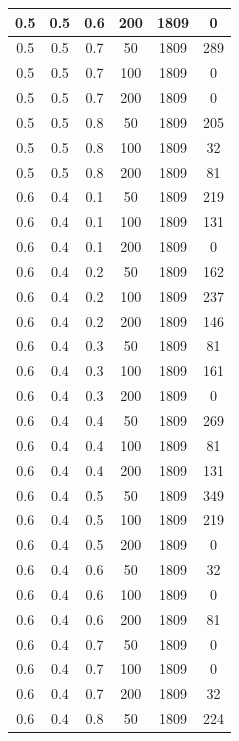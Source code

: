 \documentclass[a4paper,14pt, unknownkeysallowed]{extreport}
\begin{document}
\begin{center}
\begin{longtable}[c]{|c|c|c|c|c|c|}
		0.5 &  0.5 &  0.6 &  200 &  1809 &     0 \\
	   \hline
		0.5 &  0.5 &  0.7 &   50 &  1809 &   289 \\
		0.5 &  0.5 &  0.7 &  100 &  1809 &     0 \\
		0.5 &  0.5 &  0.7 &  200 &  1809 &     0 \\
	   \hline
		0.5 &  0.5 &  0.8 &   50 &  1809 &   205 \\
		0.5 &  0.5 &  0.8 &  100 &  1809 &    32 \\
		0.5 &  0.5 &  0.8 &  200 &  1809 &    81 \\
	   \hline
		0.6 &  0.4 &  0.1 &   50 &  1809 &   219 \\
		0.6 &  0.4 &  0.1 &  100 &  1809 &   131 \\
		0.6 &  0.4 &  0.1 &  200 &  1809 &     0 \\
	   \hline
		0.6 &  0.4 &  0.2 &   50 &  1809 &   162 \\
		0.6 &  0.4 &  0.2 &  100 &  1809 &   237 \\
		0.6 &  0.4 &  0.2 &  200 &  1809 &   146 \\
	   \hline
		0.6 &  0.4 &  0.3 &   50 &  1809 &    81 \\
		0.6 &  0.4 &  0.3 &  100 &  1809 &   161 \\
		0.6 &  0.4 &  0.3 &  200 &  1809 &     0 \\
	   \hline
		0.6 &  0.4 &  0.4 &   50 &  1809 &   269 \\
		0.6 &  0.4 &  0.4 &  100 &  1809 &    81 \\
		0.6 &  0.4 &  0.4 &  200 &  1809 &   131 \\
	   \hline
		0.6 &  0.4 &  0.5 &   50 &  1809 &   349 \\
		0.6 &  0.4 &  0.5 &  100 &  1809 &   219 \\
		0.6 &  0.4 &  0.5 &  200 &  1809 &     0 \\
	   \hline
		0.6 &  0.4 &  0.6 &   50 &  1809 &    32 \\
		0.6 &  0.4 &  0.6 &  100 &  1809 &     0 \\
		0.6 &  0.4 &  0.6 &  200 &  1809 &    81 \\
	   \hline
		0.6 &  0.4 &  0.7 &   50 &  1809 &     0 \\
		0.6 &  0.4 &  0.7 &  100 &  1809 &     0 \\
		0.6 &  0.4 &  0.7 &  200 &  1809 &    32 \\
	   \hline
		0.6 &  0.4 &  0.8 &   50 &  1809 &   224 \\

\end{longtable}
\end{center}
\end{document}
